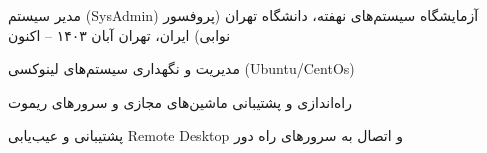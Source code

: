 

\begin{cventries}

  \cventry
    {مدیر سیستم (SysAdmin)} %
    {آزمایشگاه سیستم‌های نهفته، دانشگاه تهران (پروفسور نوابی)} %
    {ایران، تهران} %
    {آبان ۱۴۰۳ – اکنون} %
    {
      \begin{cvitems}
        \item {مدیریت و نگهداری سیستم‌های لینوکسی (Ubuntu/CentOs)}
        \item {راه‌اندازی و پشتیبانی ماشین‌های مجازی و سرورهای ریموت}
        \item {پشتیبانی و عیب‌یابی Remote Desktop و اتصال به سرورهای راه دور}
      \end{cvitems}
    }
  
\end{cventries}
